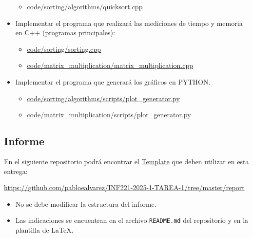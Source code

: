 \begin{itemize}
\begin{itemize}
        \item \href{https://github.com/pabloealvarez/INF221-2025-1-TAREA-1/blob/master/code/sorting/algorithms/quicksort.cpp}{code/sorting/algorithms/quicksort.cpp}
    \end{itemize}
    \item Implementar el programa que realizará las mediciones de tiempo y memoria en C++ (programas principales):
    \begin{itemize}
        \item \href{https://github.com/pabloealvarez/INF221-2025-1-TAREA-1/blob/master/code/sorting/sorting.cpp}{code/sorting/sorting.cpp}
        \item \href{https://github.com/pabloealvarez/INF221-2025-1-TAREA-1/blob/master/code/matrix_multiplication/matrix_multiplication.cpp}{code/matrix\_multiplication/matrix\_multiplication.cpp}
    \end{itemize}
    \item Implementar el programa que generará los gráficos en PYTHON.
    \begin{itemize}
        \item \href{https://github.com/pabloealvarez/INF221-2025-1-TAREA-1/blob/master/code/sorting/scripts/array_generator.py}{code/sorting/algorithms/scripts/plot_generator.py}
        \item \href{https://github.com/pabloealvarez/INF221-2025-1-TAREA-1/blob/master/code/matrix_multiplication/scripts/matrix_generator.py}{code/matrix\_multiplication/scripts/plot\_generator.py}
    \end{itemize}
\end{itemize}

\subsection{Informe}


En el siguiente repositorio podrá encontrar el \href{https://github.com/pabloealvarez/INF221-2025-1-TAREA-1/tree/master/report}{Template} que deben utilizar en esta entrega:

\begin{mdframed}

\begin{center}
    
    \url{https://github.com/pabloealvarez/INF221-2025-1-TAREA-1/tree/master/report}
        
\end{center}
\end{mdframed}

\begin{itemize}
    \item No se debe modificar la estructura del informe.
    \item Las indicaciones se encuentran en el archivo \texttt{README.md} del repositorio y en la plantilla de \LaTeX. 
\end{itemize}

